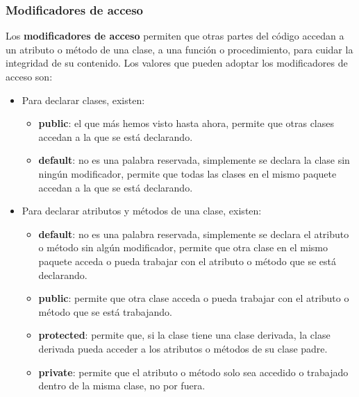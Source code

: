 \subsubsection{Modificadores de acceso}
\hspace{0.55cm}Los \textbf{modificadores de acceso} permiten que otras partes del código accedan a un atributo o método de una clase, a una función o procedimiento, para cuidar la integridad de su contenido. Los valores que pueden adoptar los modificadores de acceso son:
\begin{itemize}
    \item Para declarar clases, existen:
        \begin{itemize}
            \item \textbf{public}: el que más hemos visto hasta ahora, permite que otras clases accedan a la que se está declarando.
            \item \textbf{default}: no es una palabra reservada, simplemente se declara la clase sin ningún modificador, permite que todas las clases en el mismo paquete accedan a la que se está declarando.
        \end{itemize}
    \item Para declarar atributos y métodos de una clase, existen:
        \begin{itemize}
            \item \textbf{default}: no es una palabra reservada, simplemente se declara el atributo o método sin algún modificador, permite que otra clase en el mismo paquete acceda o pueda trabajar con el atributo o método que se está declarando.
            \item \textbf{public}: permite que otra clase acceda o pueda trabajar con el atributo o método que se está trabajando.
            \item \textbf{protected}: permite que, si la clase tiene una clase derivada, la clase derivada pueda acceder a los atributos o métodos de su clase padre.
            \item \textbf{private}: permite que el atributo o método solo sea accedido o trabajado dentro de la misma clase, no por fuera.
        \end{itemize}
\end{itemize}


